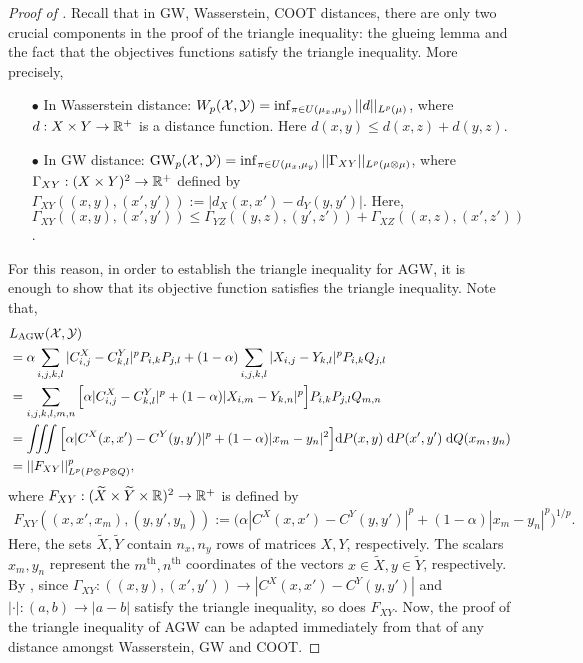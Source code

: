 \begin{proof}[Proof of ]
    Recall that in GW, Wasserstein, COOT distances, there are only two crucial
    components in the proof of the triangle inequality: the glueing lemma
    and the fact that the objectives functions satisfy the triangle inequality.
    More precisely,
      \begin{itemize}
          \item[$\bullet$] In Wasserstein distance: $W_p(\mathcal X, \mathcal Y)= \inf_{\pi \in U(\mu_x, \mu_y)} ||d||_{L^p(\mu)}$, where $d: X \times Y \to \mathbb R^+$ is
          a distance function. Here $d(x, y) \leq d(x, z) + d(y, z)$.
          \item[$\bullet$] In GW distance: $\text{GW}_p(\mathcal X, \mathcal Y)= \inf_{\pi \in U(\mu_x, \mu_y)} ||\Gamma_{XY}||_{L^p(\mu \otimes \mu)}$,
          where $\Gamma_{XY} : (X \times Y)^2 \to \mathbb R^+$ defined by
          $\Gamma_{XY}((x, y), (x', y')) := |d_X(x, x') - d_Y(y, y')|$. Here,
          $\Gamma_{XY}((x, y), (x', y')) \leq \Gamma_{YZ}((y, z), (y', z')) + \Gamma_{XZ}((x, z), (x', z'))$.
      \end{itemize}
      For this reason, in order to establish the triangle inequality for AGW,
      it is enough to show that its objective function
      satisfies the triangle inequality. Note that,
      \begin{align}
          &L_{\text{AGW}}(\mathcal X, \mathcal Y) \\
          &= \alpha \sum_{i,j,k,l} |C^X_{i,j} - C^Y_{k,l}|^p P_{i,k} P_{j, l}
          + (1 - \alpha) \sum_{i,j,k,l} |X_{i,j} - Y_{k,l}|^p P_{i,k} Q_{j,l} \\
          &= \sum_{i,j,k,l,m,n} \Big[ \alpha |C^X_{i,j} - C^Y_{k,l}|^p
          + (1 - \alpha) |X_{i,m} - Y_{k,n}|^p \Big] P_{i,k} P_{j, l} Q_{m,n} \\
          &= \iiint \Big[ \alpha |C^X(x, x') - C^Y(y, y')|^p
          + (1 - \alpha) |x_{m} - y_{n}|^2 \Big] \mathrm{d}P(x, y) \; \mathrm{d}P(x', y') \; \mathrm{d}Q(x_m, y_n) \\
          &= || F_{XY} ||^p_{L^p(P \otimes P \otimes Q)},
      \end{align}
      where $F_{XY}: (\widetilde{X} \times \widetilde{Y} \times \mathbb R)^2 \to \mathbb R^+$ is defined by
      \begin{align}
          F_{XY}((x, x', x_m), (y, y', y_n)) :=
          \Big( \alpha |C^X(x, x') - C^Y(y, y')|^p + (1 - \alpha) |x_{m} - y_{n}|^p \Big)^{1/p}.
      \end{align}
      Here, the sets $\widetilde{X}, \widetilde{Y}$ contain $n_x, n_y$ rows of matrices $X, Y$, respectively.
      The scalars $x_m, y_n$ represent the $m^{\text{th}}, n^{\text{th}}$ coordinates of
      the vectors $x \in \widetilde{X}, y \in \widetilde{Y}$, respectively.
      By , since $\Gamma_{XY}: ((x,y), (x',y')) \to |C^X(x, x') - C^Y(y, y')|$
      and $|\cdot|: (a, b) \to |a-b|$ satisfy the triangle inequality,
      so does $F_{XY}$. Now, the proof of the triangle inequality of AGW can be
      adapted immediately from that of any distance amongst Wasserstein, GW and COOT.


\end{proof}
